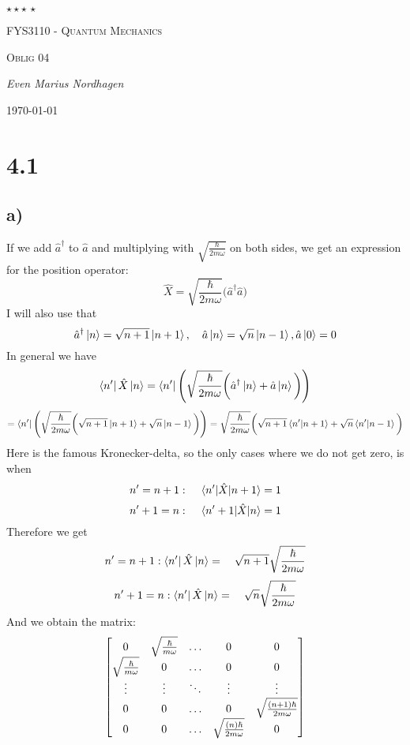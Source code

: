 \documentclass{scrartcl}
\begin{document}
\begin{titlepage}
	\centering
	{\scshape\LARGE $\star\star\star\,\star $  \par}
	\vspace{4cm}
	{\scshape\huge FYS3110 - Quantum Mechanics  \par}
	\vspace{1cm}
	{\scshape\Large Oblig 04\par}
	\vspace{2cm}
	{\Large\itshape Even Marius Nordhagen\par}
	\vfill
	{\large \today\par}
\end{titlepage}

\section*{4.1}
\subsection*{a)}
If we add $\hat{a}^\dagger$ to $\hat{a}$ and multiplying with $\sqrt{\frac{\hbar}{2m\omega}}$ on both sides, we get an expression for the position operator:
\begin{equation}
\hat{X}=\sqrt{\frac{\hbar}{2m\omega}}\bigg(\hat{a}^\dagger \hat{a}\bigg)
\end{equation}
I will also use that
$$\hat{a}^\dagger \ket{n}=\sqrt{n+1}\ket{n+1},\quad\hat{a}\ket{n}=\sqrt{n}\ket{n-1}, \hat{a}\ket{0}=0$$
In general we have
$$\bra{n'}\hat{X}\ket{n}=\bra{n'}\Bigg(\sqrt{\frac{\hbar}{2m\omega}}\bigg(\hat{a}^\dagger\ket{n}+\hat{a}\ket{n}\bigg)\Bigg)$$
$$=\bra{n'}\Bigg(\sqrt{\frac{\hbar}{2m\omega}}\bigg(\sqrt{n+1}\ket{n+1}+\sqrt{n}\ket{n-1}\bigg)\Bigg)=\sqrt{\frac{\hbar}{2m\omega}}\bigg(\sqrt{n+1}\braket{n'}{n+1}+\sqrt{n}\braket{n'}{n-1}\bigg)$$
Here is the famous Kronecker-delta, so the only cases where we do not get zero, is when $$n'=n+1:\quad \mel{n'}{\hat{X}}{n+1}=1$$
$$n'+1=n:\quad \mel{n'+1}{\hat{X}}{n}=1$$
Therefore we get 
$$n'=n+1:\bra{n'}\hat{X}\ket{n}=\quad\sqrt{n+1}\sqrt{\frac{\hbar}{2m\omega}}$$
$$n'+1=n:\bra{n'}\hat{X}\ket{n}=\quad\sqrt{n}\sqrt{\frac{\hbar}{2m\omega}}$$
And we obtain the matrix:
\begin{equation}
\mqty[0&\sqrt{\frac{\hbar}{m\omega}}&\hdots&0&0\\
      \sqrt{\frac{\hbar}{m\omega}}&0&\hdots&0&0\\
      \vdots&\vdots&\ddots&\vdots&\vdots\\
      0&0&\hdots&0&\sqrt{\frac{(n+1)\hbar}{2m\omega}}\\
      0&0&\hdots&\sqrt{\frac{(n)\hbar}{2m\omega}}&0]
\end{equation}
\end{document}
